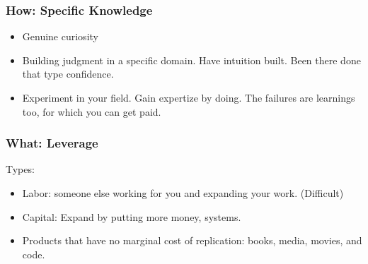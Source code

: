\begin{frame}[fragile]
\frametitle{How: Specific Knowledge}
\begin{itemize}
\item Genuine curiosity
\item Building judgment in a specific domain. Have intuition built. Been there done that type confidence.
\item Experiment in your field. Gain expertize by doing. The failures are learnings too, for which you can get paid.
\end{itemize}
\end{frame}

\begin{frame}[fragile]
\frametitle{What: Leverage}
Types:
\begin{itemize}
\item Labor: someone else working for you and expanding your work. (Difficult)
\item Capital: Expand by putting more money, systems.
\item Products that have no marginal cost of replication: books, media, movies, and code.
\end{itemize}
\end{frame}
